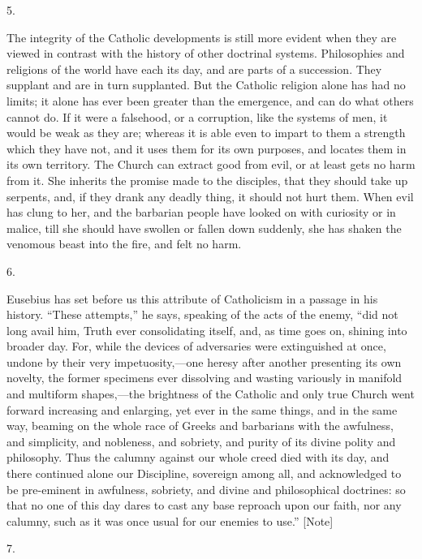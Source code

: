 5.

The integrity of the Catholic developments is still more evident
when they are viewed in contrast with the history of other doctrinal
systems. Philosophies and religions of the world have each its day,
and are parts of a succession. They supplant and are in turn
supplanted. But the Catholic religion alone has had no limits; it
alone has ever been greater than the emergence, and can do what others
cannot do. If it were a falsehood, or a corruption, like the systems
of men, it would be weak as they are; whereas it is able even to
impart to them a strength which they have not, and it uses them for
its own purposes, and locates them in its own territory. The Church
can extract good from evil, or at least gets no harm from it. She
inherits the promise made to the disciples, that they should take up
serpents, and, if they drank any deadly thing, it should not hurt
them. When evil has clung to her, and the barbarian people have looked
on with curiosity or in malice, till she should have swollen or fallen
down suddenly, she has shaken the venomous beast into the fire, and
felt no harm.

6.

Eusebius has set before us this attribute of Catholicism in a
passage in his history. ``These attempts,'' he says, speaking
of the acts of the enemy, ``did not long avail him, Truth ever
consolidating itself, and, as time goes on, shining into broader day.
For, while the devices of adversaries were extinguished at once,
undone by their very impetuosity,—one heresy after another
presenting its own novelty, the former specimens ever dissolving and
wasting variously in manifold and multiform shapes,—the brightness
of the Catholic and only true Church went forward increasing and
enlarging, yet ever in the same things, and in the same way, beaming
on the whole race of Greeks and barbarians with the awfulness, and
simplicity, and nobleness, and sobriety, and purity of its divine
polity and philosophy. Thus the calumny against our whole creed died
with its day, and there continued alone our Discipline, sovereign
among all, and acknowledged to be pre-eminent in awfulness, sobriety,
and divine and philosophical doctrines: so that no one of this day
dares to cast any base reproach upon our faith, nor any calumny,
such
as it was once usual for our enemies to use.'' [Note]

7.

